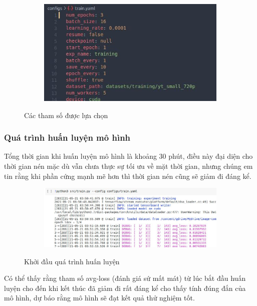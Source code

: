 \begin{figure}
    \begin{subfigure}{0.7\textwidth}
        \includegraphics[width=1.\linewidth]{Chapters/items/pram.jpg}
        \caption{}
        \label{fig: param}
    \end{subfigure}
    \caption{Các tham số được lựa chọn}
\end{figure}

\subsubsection{Quá trình huấn luyện mô hình}

Tổng thời gian khi huấn luyện mô hình là khoảng 30 phút, điều này
đại diện cho thời gian nén mặc dù vẫn chưa thực sự tối ưu về mặt
thời gian, nhưng chúng em tin rằng khi phần cứng mạnh mẽ hơn thì
thời gian nén cũng sẽ giảm đi đáng kể.

\begin{figure}
    \begin{subfigure}{0.8\textwidth}
        \includegraphics[width=1.\linewidth]{Chapters/items/colab1.jpg}
        \caption{}
        \label{fig: colab1}
    \end{subfigure}
    \caption{Khởi đầu quá trình huấn luyện}
\end{figure}

\newpage
Có thể thấy rằng tham số avg-loss (đánh giá sứ mất mát) từ lúc
bắt đầu huấn luyện cho đến khi kết thúc đã giảm đi rất đáng kể
cho thấy tính đúng đắn của mô hình, dự báo rằng mô hình sẽ đạt kết
quả thử nghiệm tốt.

